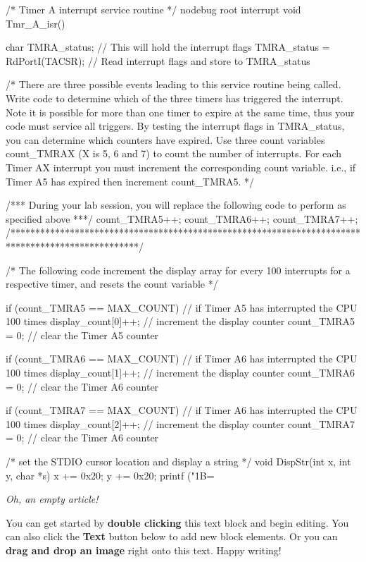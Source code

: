 /* Timer A interrupt service routine */
nodebug root interrupt void Tmr_A_isr()
{
   char TMRA_status;                                          // This will hold the interrupt flags
   TMRA_status = RdPortI(TACSR);                              // Read interrupt flags and store to TMRA_status

/* There are three possible events leading to this service routine being called. Write code to determine which of the three
timers has triggered the interrupt. Note it is possible for more than one timer to expire at the same time, thus your code must service
all triggers. By testing the interrupt flags in TMRA_status, you can determine which counters have expired. Use
three count variables count_TMRAX (X is 5, 6 and 7) to count the number of interrupts. For each Timer AX interrupt you must increment the corresponding count variable.
i.e.,   if Timer A5 has expired then increment count_TMRA5. */

/*** During your lab session, you will replace the following code to perform as specified above ***/
count_TMRA5++;
count_TMRA6++;
count_TMRA7++;
/**************************************************************************************************/


   /* The following code increment the display array for every 100 interrupts for a respective timer, and resets the count variable */

   if (count_TMRA5 == MAX_COUNT){                           // if Timer A5 has interrupted the CPU 100 times
      display_count[0]++;                                    // increment the display counter
      count_TMRA5 = 0;                                       // clear the Timer A5 counter
   }

   if (count_TMRA6 == MAX_COUNT){                           // if Timer A6 has interrupted the CPU 100 times
      display_count[1]++;                                    // increment the display counter
      count_TMRA6 = 0;                                       // clear the Timer A6 counter
   }

   if (count_TMRA7 == MAX_COUNT){                           // if Timer A6 has interrupted the CPU 100 times
      display_count[2]++;                                    // increment the display counter
      count_TMRA7 = 0;                                       // clear the Timer A6 counter
   }
}

/* set the STDIO cursor location and display a string  */
void DispStr(int x, int y, char *s)
{
   x += 0x20;
   y += 0x20;
   printf ("\x1B=%
}

\textit{Oh, an empty article!} 

You can get started by \textbf{double clicking} this text block and begin editing. You can also click the \textbf{Text} button below to add new block elements. Or you can \textbf{drag and drop an image} right onto this text. Happy writing!